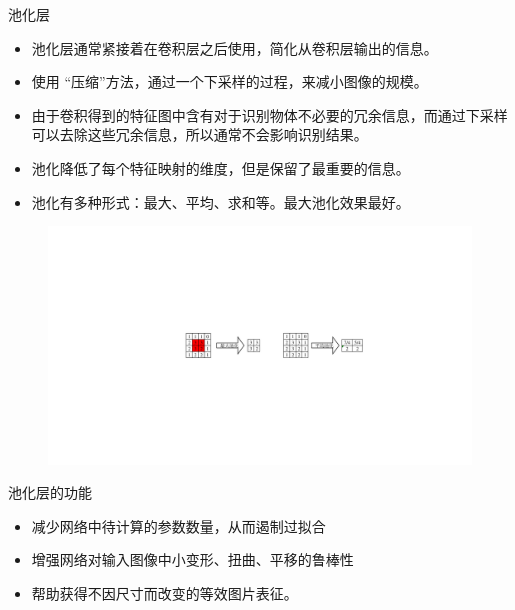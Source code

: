 \begin{note}
    池化层
    \begin{itemize}
        \item 池化层通常紧接着在卷积层之后使用，简化从卷积层输出的信息。
        \item 使用 “压缩”方法，通过一个下采样的过程，来减小图像的规模。
        \item 由于卷积得到的特征图中含有对于识别物体不必要的冗余信息，而通过下采样可以去除这些冗余信息，所以通常不会影响识别结果。
        \item 池化降低了每个特征映射的维度，但是保留了最重要的信息。
        \item 池化有多种形式：最大、平均、求和等。最大池化效果最好。
    \end{itemize}
    \begin{figure}[htbp]
        \centering
        \includegraphics{image/池化.pdf}
    \end{figure}
    \textcolor{main1}{池化层的功能}
    \begin{itemize}
        \item 减少网络中待计算的参数数量，从而遏制过拟合
        \item 增强网络对输入图像中小变形、扭曲、平移的鲁棒性
        \item 帮助获得不因尺寸而改变的等效图片表征。
    \end{itemize}
\end{note}
